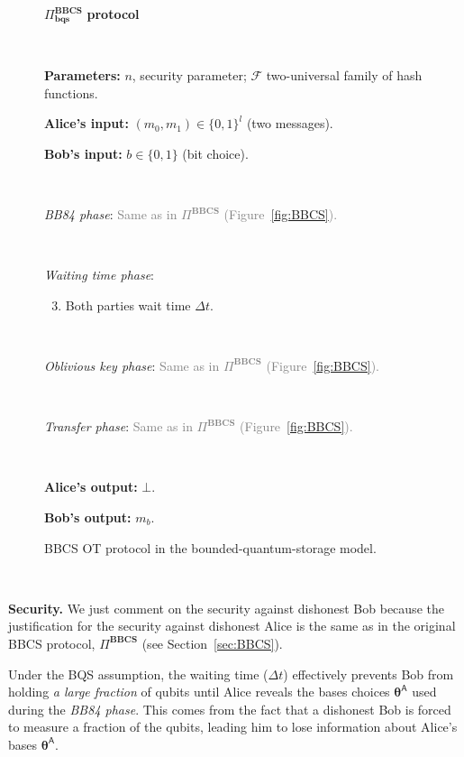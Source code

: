 \begin{figure}[h!]
\centering
\begin{tcolorbox}
    
    \centerline{$\Pi^{\textbf{BBCS}}_{\textbf{bqs}}$ \textbf{protocol}}
            
    \
    
    \textbf{Parameters:} $n$, security parameter; $\mathcal{F}$  two-universal family of hash functions.
    
    \textbf{Alice's input:} $(m_0, m_1)\in\{0,1\}^l$ (two messages). 
    
    \textbf{Bob's input:} $b\in\{0,1\}$ (bit choice).
    
    \
    
    \textit{BB84 phase}: \textcolor{gray}{Same as in $\Pi^{\textbf{BBCS}}$ (Figure~\ref{fig:BBCS}).}
    
    
    \
    
    \textit{Waiting time phase}:
    \begin{enumerate}
    \setcounter{enumi}{2}
        \item Both parties wait time $\Delta t$.
    \end{enumerate}
    
    \
    
    \textit{Oblivious key phase}: \textcolor{gray}{Same as in $\Pi^{\textbf{BBCS}}$ (Figure~\ref{fig:BBCS}).}
     
    \
     
    \textit{Transfer phase}: \textcolor{gray}{Same as in $\Pi^{\textbf{BBCS}}$ (Figure~\ref{fig:BBCS}).}
    
    \
    
\textbf{Alice's output:} $\bot$.

\textbf{Bob's output:} $m_b$.
    
\end{tcolorbox}
    \caption{BBCS OT protocol in the bounded-quantum-storage model.}
    \label{fig:BBCS_Bounded}
\end{figure}

\

\noindent\textbf{Security.} We just comment on the security against dishonest Bob because the justification for the security against dishonest Alice is the same as in the original BBCS protocol, $\Pi^{\textbf{BBCS}}$ (see Section~\ref{sec:BBCS}). 

Under the BQS assumption, the waiting time ($\Delta t$) effectively prevents Bob from holding \textit{a large fraction} of qubits until Alice reveals the bases choices $\bm{\theta}^{\mathsf{A}}$ used during the \textit{BB84 phase}. This comes from the fact that a dishonest Bob is forced to measure a fraction of the qubits, leading him to lose information about Alice's bases $\bm{\theta}^{\mathsf{A}}$.

